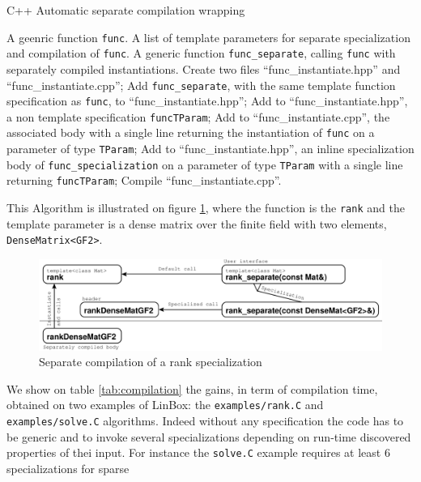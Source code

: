 \documentclass[runningheads,a4paper]{llncs}
\newcommand{\linbox}{{\sc LinBox}}
\begin{document}
\begin{algorithm}[ht]
\caption{C++ Automatic separate compilation wrapping}\label{alg:sep}
\begin{algorithmic}[1]
\REQUIRE A geenric function \texttt{func}.
\REQUIRE A list of template parameters for separate specialization and
compilation of  \texttt{func}.
\ENSURE A generic function \texttt{func\_separate}, calling
\texttt{func} with separately compiled instantiations.
\STATE Create two files ``func\_instantiate.hpp'' and ``func\_instantiate.cpp'';
\STATE Add \texttt{func\_separate}, with the same template function
specification as \texttt{func}, to ``func\_instantiate.hpp'';
  \STATE Add to ``func\_instantiate.hpp'', a non template specification
  \texttt{funcTParam};
  \STATE Add to ``func\_instantiate.cpp'', the associated body with a
  single line returning the instantiation of
  \texttt{func} on a parameter of type \texttt{TParam};
  \STATE Add to ``func\_instantiate.hpp'', an inline specialization
  body of \texttt{func\_specialization} on a parameter of type
  \texttt{TParam} with a single line returning \texttt{funcTParam}; 
\ENDFOR
\STATE Compile ``func\_instantiate.cpp''.
\end{algorithmic}
\end{algorithm}
This Algorithm is illustrated on figure \ref{fig:sep}, where
the function is the \texttt{rank} and the template parameter is a dense
matrix over the finite field with two elements,
\texttt{DenseMatrix<GF2>}.\\
\begin{figure}[ht]
\includegraphics[width=\textwidth]{separate}
\caption{Separate compilation of a rank specialization}\label{fig:sep}
\end{figure}
We show on table \ref{tab:compilation} the gains, in term of compilation time,
obtained on two examples of \linbox: the \texttt{examples/rank.C} and
\texttt{examples/solve.C} algorithms. Indeed without any specification
the code
has to be generic and to invoke several specializations depending on
run-time discovered properties of thei input. For instance the
\texttt{solve.C} example requires at least 6 specializations for sparse
\end{document}
